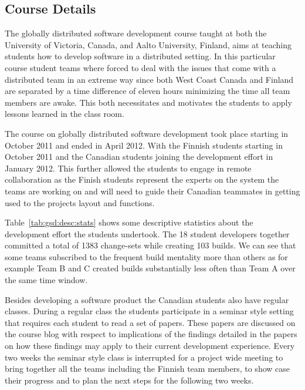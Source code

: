 
\subsection{Course Details}
The globally distributed software development course taught at both the University of Victoria, Canada, and Aalto University, Finland, aims at teaching students how to develop software in a distributed setting.
In this particular course student teams where forced to deal with the issues that come with a distributed team in an extreme way since both West Coast Canada and Finland are separated by a time difference of eleven hours minimizing the time all team members are awake.
This both necessitates and motivates the students to apply lessons learned in the class room.

The course on globally distributed software development took place starting in October 2011 and ended in April 2012.
With the Finnish students starting in October 2011 and the Canadian students joining the development effort in January 2012.
This further allowed the students to engage in remote collaboration as the Finish students represent the experts on the system the teams are working on and will need to guide their Canadian teammates in getting used to the projects layout and functions.

Table~\ref{tab:gsd:desc:stats} shows some descriptive statistics about the development effort the students undertook.
The 18 student developers together committed a total of 1383 change-sets while creating 103 builds.
We can see that some teams subscribed to the frequent build mentality more than others as for example Team B and C created builds substantially less often than Team A over the same time window.

Besides developing a software product the Canadian students also have regular classes.
During a regular class the students participate in a seminar style setting that requires each student to read a set of papers.
These papers are discussed on the course blog with respect to implications of the findings detailed in the papers on how these findings may apply to their current development experience.
Every two weeks the seminar style class is interrupted for a project wide meeting to bring together all the teams including the Finnish team members, to show case their progress and to plan the next steps for the following two weeks.

